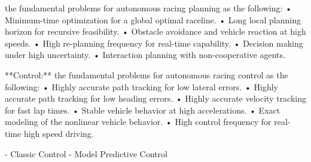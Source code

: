 the fundamental problems for autonomous racing planning as the following: 
	• Minimum-time optimization for a global optimal raceline. 
	• Long local planning horizon for recursive feasibility. 
	• Obstacle avoidance and vehicle reaction at high speeds. 
	• High re-planning frequency for real-time capability. 
	• Decision making under high uncertainty. • Interaction planning with non-cooperative agents.

**Control:**
the fundamental problems for autonomous racing control as the following: 
	• Highly accurate path tracking for low lateral errors. 
	• Highly accurate path tracking for low heading errors. 
	• Highly accurate velocity tracking for fast lap times. 
	• Stable vehicle behavior at high accelerations. 
	• Exact modeling of the nonlinear vehicle behavior. 
	• High control frequency for real-time high speed driving.

- Classic Control
- Model Predictive Control



